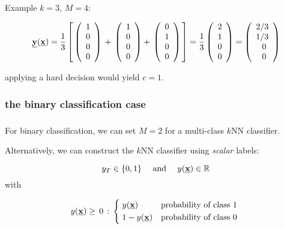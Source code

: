 \begin{frame}
Example $k=3$, $M=4$:

\begin{equation}
\underline{\mathbf{y}}(\underline{\mathbf{x}}) = \frac{1}{3}
\left\lbrack
\,
\left( \begin{array}{rrrrrrrrrrrrrrrrrrrrrrrrrr}  1 \\ 0 \\ 0 \\ 0\\ \end{array} \right)\, +\,
\left( \begin{array}{rrrrrrrrrrrrrrrrrrrrrrrrrr}  1 \\ 0 \\ 0 \\ 0\\ \end{array} \right) +\,
\left( \begin{array}{rrrrrrrrrrrrrrrrrrrrrrrrrr}  0 \\ 1 \\ 0 \\ 0\\ \end{array} \right)\,
\right\rbrack
=
\frac{1}{3}
\left( \begin{array}{rrrrrrrrrrrrrrrrrrrrrrrrrr}  2 \\ 1 \\ 0 \\ 0\\ \end{array} \right)
=
\left( \begin{array}{rrrrrrrrrrrrrrrrrrrrrrrrrr}  2/3 \\ 1/3 \\ 0\; \\ 0\;\\ \end{array} \right)
\end{equation}

applying a hard decision would yield $c=1$.
    
\end{frame}

\subsubsection{the binary classification case}

\begin{frame}\frametitle{\subsubsecname}

For binary classification, we can set $M=2$ for a multi-class $k$NN classifier.

Alternatively, we can construct the $k$NN classifier  using \emph{scalar} labels:

\begin{equation}
y_T \in \{0,1\}\quad \text{ and }\quad y(\underline{\mathbf{x}}) \in \mathbb{R}
\end{equation}
with

\begin{equation}
y(\vec x) \ge\,0\,:\,
\begin{cases*}
      \;y(\vec x) & probability of class $1$ \\
      \;1-y(\vec x)     & probability of class $0$
    \end{cases*}
\end{equation}

\end{frame}

